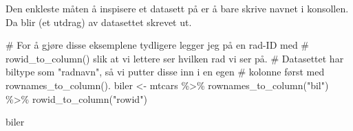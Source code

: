 \documentclass[
  letterpaper,
  DIV=11,
  numbers=noendperiod]{scrreprt}
\newenvironment{Shaded}{\begin{snugshade}}{\end{snugshade}}
\newcommand{\CommentTok}[1]{\textcolor[rgb]{0.37,0.37,0.37}{#1}}
\newcommand{\FunctionTok}[1]{\textcolor[rgb]{0.28,0.35,0.67}{#1}}
\newcommand{\NormalTok}[1]{\textcolor[rgb]{0.00,0.23,0.31}{#1}}
\newcommand{\OtherTok}[1]{\textcolor[rgb]{0.00,0.23,0.31}{#1}}
\newcommand{\SpecialCharTok}[1]{\textcolor[rgb]{0.37,0.37,0.37}{#1}}
\newcommand{\StringTok}[1]{\textcolor[rgb]{0.13,0.47,0.30}{#1}}
\begin{document}
Den enkleste måten å inspisere et datasett på er å bare skrive navnet i
konsollen. Da blir (et utdrag) av datasettet skrevet ut.

\begin{Shaded}
\begin{Highlighting}[]
\CommentTok{\# For å gjøre disse eksemplene tydligere legger jeg på en rad{-}ID med }
\CommentTok{\# \textasciigrave{}rowid\_to\_column()\textasciigrave{} slik at vi lettere ser hvilken rad vi ser på.}
\CommentTok{\# Datasettet har biltype som "radnavn", så vi putter disse inn i en egen}
\CommentTok{\# kolonne først med \textasciigrave{}rownames\_to\_column()\textasciigrave{}.}
\NormalTok{biler }\OtherTok{\textless{}{-}}\NormalTok{ mtcars }\SpecialCharTok{\%\textgreater{}\%} 
  \FunctionTok{rownames\_to\_column}\NormalTok{(}\StringTok{"bil"}\NormalTok{) }\SpecialCharTok{\%\textgreater{}\%} 
  \FunctionTok{rowid\_to\_column}\NormalTok{(}\StringTok{"rowid"}\NormalTok{)}

\NormalTok{biler}
\end{Highlighting}
\end{Shaded}
\end{document}
